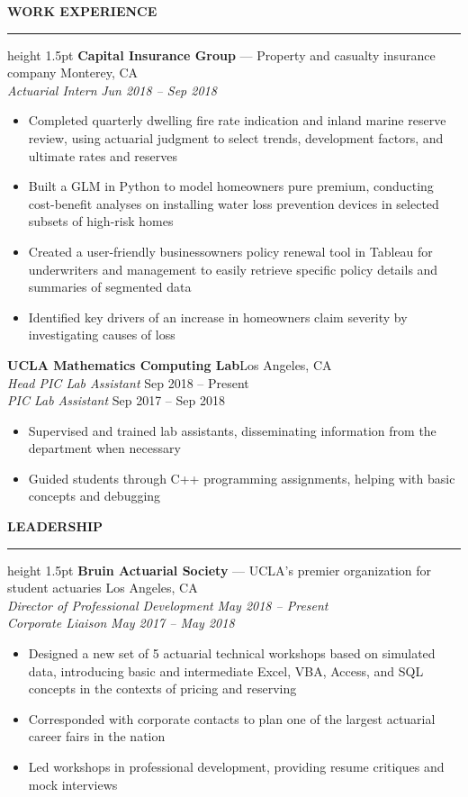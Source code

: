 \documentclass[11pt,letterpaper]{article}
\newcommand{\sectline}{\vspace{3pt}\hrule height 1.5pt\vspace{3pt}}
\newcommand{\sectspace}{\vspace{8pt}}
\newcommand{\smallspace}{\vspace{4pt}}
\begin{document}
\textbf{WORK EXPERIENCE}\sectline
\textbf{Capital Insurance Group} --- Property and casualty insurance company \hfill Monterey, CA \\
\textit{Actuarial Intern} \hfill \textit{Jun 2018 -- Sep 2018 }
\begin{itemize}
	\item Completed quarterly dwelling fire rate indication and inland marine reserve review, using actuarial judgment to select trends, development factors, and ultimate rates and reserves
	\item Built a GLM in Python to model homeowners pure premium, conducting cost-benefit analyses on installing water loss prevention devices in selected subsets of high-risk homes 
	\item Created a user-friendly businessowners policy renewal tool in Tableau for underwriters and management to easily retrieve specific policy details and summaries of segmented data
	\item Identified key drivers of an increase in homeowners claim severity by investigating causes of loss
\end{itemize}
\smallspace 
\textbf{UCLA Mathematics Computing Lab}\hfill Los Angeles, CA \\
\textit{Head PIC Lab Assistant} \hfill Sep 2018 -- Present \\
\textit{PIC Lab Assistant} \hfill Sep 2017 -- Sep 2018
\begin{itemize}
	\item Supervised and trained lab assistants, disseminating information from the department when necessary
	\item Guided students through C++ programming assignments, helping with basic concepts and debugging
\end{itemize}
\sectspace


\textbf{LEADERSHIP} \sectline
\textbf{Bruin Actuarial Society} --- UCLA's premier organization for student actuaries \hfill Los Angeles, CA \\
\textit{Director of Professional Development} \hfill \textit{May 2018 -- Present} \\
\textit{Corporate Liaison} \hfill \textit{May 2017 -- May 2018}
\begin{itemize}
	\item Designed a new set of 5 actuarial technical workshops based on simulated data, introducing basic and intermediate Excel, VBA, Access, and SQL concepts in the contexts of pricing and reserving
	\item Corresponded with corporate contacts to plan one of the largest actuarial career fairs in the nation
	\item Led workshops in professional development, providing resume critiques and mock interviews
\end{itemize}
\sectspace
\end{document}
